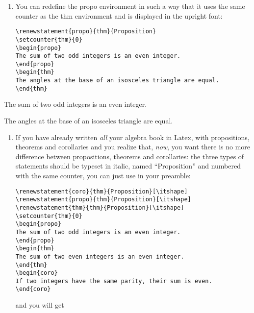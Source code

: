 \documentclass[english,ColorTheme=Red,FontSize=10pt]{tango}
\newcommand\TO[1]{\textsf{#1}}
\begin{document}
\begin{example}[Examples]
\begin{enumerate}
\item You can redefine the \TO{propo} environment in such a way that it uses the same counter as the \TO{thm} environment and is displayed in the upright font:
\begin{tcolorbox}
\begin{verbatim}
\renewstatement{propo}{thm}{Proposition}
\setcounter{thm}{0}
\begin{propo}
The sum of two odd integers is an even integer.
\end{propo}
\begin{thm}
The angles at the base of an isosceles triangle are equal.
\end{thm}
\end{verbatim}
\end{tcolorbox}
\end{enumerate}
\setcounter{thm}{0}
\begin{propo}
The sum of two odd integers is an even integer.
\end{propo}
\begin{thm}
The angles at the base of an isosceles triangle are equal.
\end{thm}

\begin{enumerate}[resume]
\item If you have already written \emph{all} your algebra book in Latex, with propositions, theorems and corollaries and you realize that, \emph{now}, you want there is no more difference between propositions, theorems and corollaries: the three types of statements should be typeset in italic, named \enquote{Proposition} and numbered with the same counter, you can just use in your preamble:

\begin{tcolorbox}
\begin{verbatim}
\renewstatement{coro}{thm}{Proposition}[\itshape]
\renewstatement{propo}{thm}{Proposition}[\itshape]
\renewstatement{thm}{thm}{Proposition}[\itshape]
\setcounter{thm}{0}
\begin{propo}
The sum of two odd integers is an even integer.
\end{propo}
\begin{thm}
The sum of two even integers is an even integer.
\end{thm}
\begin{coro}
If two integers have the same parity, their sum is even.
\end{coro}
\end{verbatim}
\end{tcolorbox}
and you will get


\end{enumerate}
\end{example}
\end{document}

